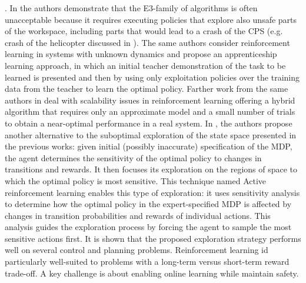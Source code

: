 . 
In \cite{abbeel2005exploration} the authors demonstrate that the E3-family of algorithms \cite{kearns2002near} is often unacceptable because it requires executing policies that explore also unsafe parts of the workspace, including parts that would lead to a crash of the CPS (e.g. crash of the helicopter discussed in \cite{abbeel2005exploration}). The same authors consider reinforcement learning in systems with unknown dynamics and propose an apprenticeship learning approach, in which an initial teacher demonstration of the task to be learned is presented and then by using only exploitation policies over the training data from the teacher to learn the optimal policy. Farther work from the same authors in \cite{abbeel2006using} deal with scalability issues in reinforcement learning offering a hybrid algorithm that requires only an approximate model and a small number of trials to obtain a near-optimal performance in a real system.
In \cite{epshteyn2008active}, the authors propose another alternative to the suboptimal exploration of the state space presented in the previous works: given initial (possibly inaccurate) specification of the MDP, the agent determines the sensitivity of the optimal policy to changes in transitions and rewards. It then focuses its exploration on the regions of space to which the optimal policy is most sensitive. This technique named Active reinforcement learning enables this type of exploration: it uses sensitivity analysis to determine how the optimal policy in the expert-specified MDP is affected by changes in transition probabilities and rewards of individual actions. This analysis guides the exploration process by forcing the agent to sample the most sensitive actions first. It is shown that the proposed exploration strategy performs well on several control and planning problems.
Reinforcement learning id particularly well-suited to problems with a long-term versus short-term reward trade-off. A key challenge is about enabling online learning while maintain safety.

